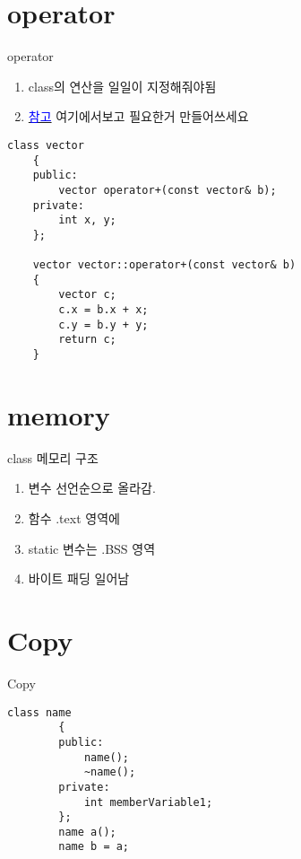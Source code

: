 \documentclass[10pt]{beamer}
\begin{document}
\section{operator}


\begin{frame}[fragile]{operator}
    \begin{enumerate}
        \item class의 연산을 일일이 지정해줘야됨
        \item \href{https://en.wikipedia.org/wiki/Operators_in_C_and_C%2B%2B}{\textcolor{blue}{참고}}
        여기에서보고 필요한거 만들어쓰세요
        

    \end{enumerate}


    \begin{lstlisting}[style = CppStyle]
    class vector
    {
    public:
        vector operator+(const vector& b);
    private:
        int x, y;
    };

    vector vector::operator+(const vector& b)
    {
        vector c;
        c.x = b.x + x;
        c.y = b.y + y;
        return c;
    }
    \end{lstlisting}
    
\end{frame}    


\section{memory}

\begin{frame}{class 메모리 구조}
    \begin{enumerate}
        \item 변수 선언순으로 올라감.
        \item 함수 .text 영역에
        \item static 변수는 .BSS 영역
        \item 바이트 패딩 일어남
    \end{enumerate}
\end{frame}    


\section{Copy}

\begin{frame}[fragile]{Copy}
    \begin{lstlisting}[style = CppStyle]
        class name
        {
        public:
            name();
            ~name();
        private:
            int memberVariable1;
        };
        name a();
        name b = a; 
        \end{lstlisting}
\end{frame}    
\end{document}

